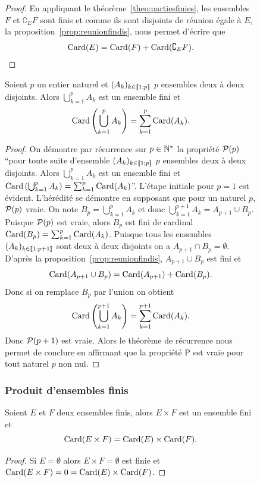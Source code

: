 \begin{figure}
\begin{proof}
  En appliquant le théorème~\ref{theo:partiesfinies}, les ensembles \(F\) et \(\complement_E F\) sont finis et comme ils sont disjoints de réunion égale à \(E\), la proposition~\ref{prop:reunionfindis}, nous permet d'écrire que
  \begin{equation}
    \Card(E)=\Card(F)+\Card(\complement_E F).
  \end{equation}
\end{proof}
\begin{prop}
  Soient \(p\) un entier naturel et \((A_k)_{k\in\intervalleentier{1}{p}}\) \(p\) ensembles deux à deux disjoints. Alors \(\bigcup_{k=1}^{p}A_k\) est un ensemble fini et
  \begin{equation}
    \Card\left(\bigcup_{k=1}^{p}A_k\right)=\sum_{k=1}^{p}\Card(A_k).
  \end{equation}
\end{prop}
\begin{proof}
  On démontre par récurrence sur \(p\in \N^*\) la propriété \(\P(p)\) ``pour toute suite d'ensemble \((A_k)_{k\in\intervalleentier{1}{p}}\) \(p\) ensembles deux à deux disjoints. Alors \(\bigcup_{k=1}^{p}A_k\) est un ensemble fini et \(\Card\left(\bigcup_{k=1}^{p}A_k\right)=\sum_{k=1}^{p}\Card(A_k)\)''. L'étape initiale pour \(p=1\) est évident. L'hérédité se démontre en supposant que pour un naturel \(p\), \(\P(p)\) vraie. On note \(B_p=\bigcup_{k=1}^{p}A_k\) et donc \(\bigcup_{k=1}^{p+1}A_k=A_{p+1}\cup B_p\). Puisque \(\P(p)\) est vraie, alors \(B_p\) est fini de cardinal \(\Card(B_p)=\sum_{k=1}^{p}\Card(A_k)\). Puisque tous les ensembles \((A_k)_{k\in\intervalleentier{1}{p+1}}\) sont deux à deux disjoints on a \(A_{p+1}\cap B_p=\emptyset\). D'après la proposition~\ref{prop:reunionfindis}, \(A_{p+1}\cup B_p\) est fini et
\begin{equation}
  \Card(A_{p+1}\cup B_p) = \Card(A_{p+1})+\Card(B_p).
\end{equation}
Donc si on remplace \(B_p\) par l'union on obtient
\begin{equation}
  \Card\left(\bigcup_{k=1}^{p+1}A_k\right) = \sum_{k=1}^{p+1}\Card(A_k).
\end{equation}
Donc \(\P(p+1)\) est vraie. Alors le théorème de récurrence nous permet de conclure en affirmant que la propriété P est vraie pour tout naturel \(p\) non nul.
\end{proof}

\subsubsection{Produit d'ensembles finis}
\begin{prop}\label{prop:produitfini}
  Soient \(E\) et \(F\) deux ensembles finis, alors \(E\times F\) est un ensemble fini et
  \begin{equation}
    \Card(E\times F)=\Card(E)\times \Card(F).
  \end{equation}
\end{prop}
\begin{proof}
Si \(E=\emptyset\) alors \(E\times F=\emptyset\) est finie et \(\Card(E\times F)=0=\Card(E)\times \Card(F)\).
  

\end{proof}
\end{figure}
